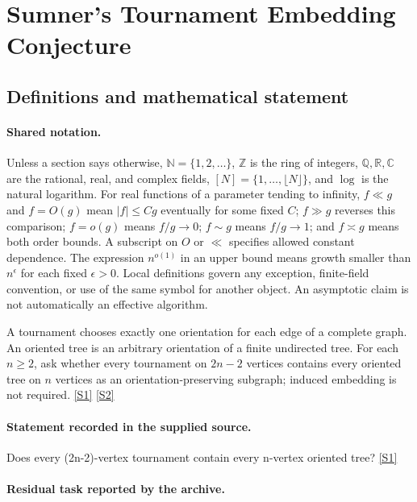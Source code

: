 \documentclass[11pt,a4paper]{article}
\newcommand{\N}{\mathbb{N}}
\newcommand{\Z}{\mathbb{Z}}
\newcommand{\Q}{\mathbb{Q}}
\newcommand{\R}{\mathbb{R}}
\newcommand{\C}{\mathbb{C}}
\newcommand{\sref}[2]{\hyperlink{source:#1:#2}{[S#2]}}
\begin{document}
\section{Sumner’s Tournament Embedding Conjecture}\label{statement}


\subsection{Definitions and mathematical statement}

\paragraph{Shared notation.}Unless a section says otherwise, $\N=\{1,2,\ldots\}$,
$\Z$ is the ring of integers, $\Q,\R,\C$ are the rational, real, and complex
fields, $[N]=\{1,\ldots,\lfloor N\rfloor\}$, and $\log$ is the natural
logarithm. For real functions of a parameter tending to infinity,
$f\ll g$ and $f=O(g)$ mean $|f|\leq Cg$ eventually for some fixed $C$;
$f\gg g$ reverses this comparison; $f=o(g)$ means $f/g\to0$;
$f\sim g$ means $f/g\to1$; and $f\asymp g$ means both order bounds.
A subscript on $O$ or $\ll$ specifies allowed constant dependence.
The expression $n^{o(1)}$ in an upper bound means growth smaller than
$n^\epsilon$ for each fixed $\epsilon>0$. Local definitions govern any
exception, finite-field convention, or use of the same symbol for another
object. An asymptotic claim is not automatically an effective algorithm.



A tournament chooses exactly one orientation for each edge of a complete graph. An oriented tree is an arbitrary orientation of a finite undirected tree. For each $n\geq2$, ask whether every tournament on $2n-2$ vertices contains every oriented tree on $n$ vertices as an orientation-preserving subgraph; induced embedding is not required. \sref{statement}{1} \sref{statement}{2}

\paragraph{Statement recorded in the supplied source.}
Does every (2n-2)-vertex tournament contain every n-vertex oriented tree? \sref{statement}{1}

\paragraph{Residual task reported by the archive.}
\end{document}
